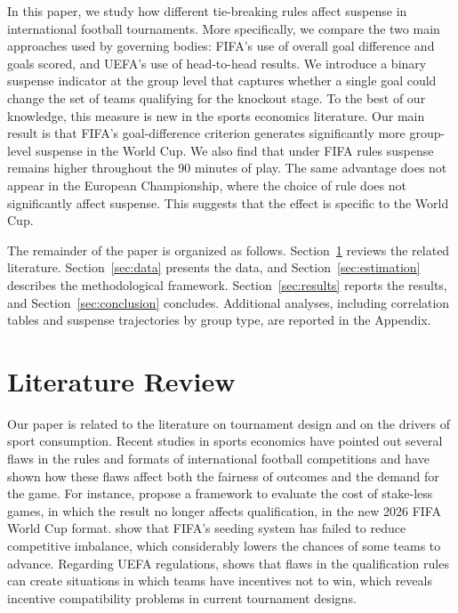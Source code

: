 \documentclass[11pt]{article}
\begin{document}
In this paper, we study how different tie-breaking rules affect suspense in international football tournaments. More specifically, we compare the two main approaches used by governing bodies: FIFA's use of overall goal difference and goals scored, and UEFA's use of head-to-head results. We introduce a binary suspense indicator at the group level that captures whether a single goal could change the set of teams qualifying for the knockout stage. To the best of our knowledge, this measure is new in the sports economics literature. Our main result is that FIFA's goal-difference criterion generates significantly more group-level suspense in the World Cup. We also find that under FIFA rules suspense remains higher throughout the 90 minutes of play. The same advantage does not appear in the European Championship, where the choice of rule does not significantly affect suspense. This suggests that the effect is specific to the World Cup.

\vspace{0.5em}

The remainder of the paper is organized as follows. Section~\ref{sec:literature} reviews the related literature. Section~\ref{sec:data} presents the data, and Section~\ref{sec:estimation} describes the methodological framework. Section~\ref{sec:results} reports the results, and Section~\ref{sec:conclusion} concludes. Additional analyses, including correlation tables and suspense trajectories by group type, are reported in the Appendix.

\section{Literature Review}
\label{sec:literature}

Our paper is related to the literature on tournament design and on the drivers of sport consumption. Recent studies in sports economics have pointed out several flaws in the rules and formats of international football competitions and have shown how these flaws affect both the fairness of outcomes and the demand for the game. For instance, \citet{csato2025increasing} propose a framework to evaluate the cost of stake-less games, in which the result no longer affects qualification, in the new 2026 FIFA World Cup format. \citet{lapre2022quantifying, lapre2023evolution} show that FIFA's seeding system has failed to reduce competitive imbalance, which considerably lowers the chances of some teams to advance. Regarding UEFA regulations, \citet{csato2020neither} shows that flaws in the qualification rules can create situations in which teams have incentives not to win, which reveals incentive compatibility problems in current tournament designs.
\end{document}
